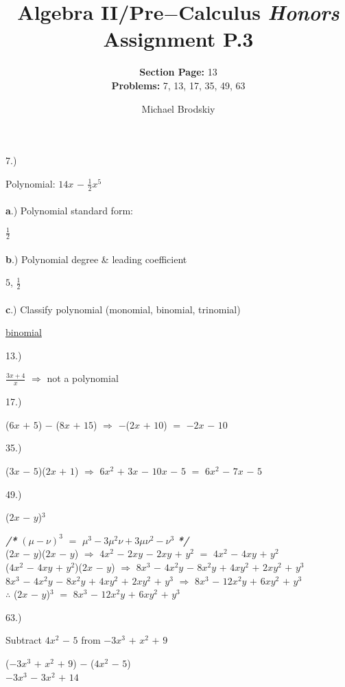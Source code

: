 \documentclass[12pt]{article}
\title{\textbf{Algebra II/Pre$-$Calculus \textit{Honors}}  \\ Assignment P.3}
\date{}
\subtitle{\textbf{Section Page:} 13\\\textbf{Problems:} 7, 13, 17, 35, 49, 63}
\author{Michael Brodskiy}
\begin{document}
\maketitle
{\setlength{\parindent}{0cm}
7.) 
    \begin{center} Polynomial: $14x$ $-$ $\frac{1}{2}x^5$ \end{center}
    \paragraph{}\textbf{a}.) Polynomial standard form:
        \begin{center} $\frac{1}{2}$ \end{center}
    \paragraph{}\textbf{b}.) Polynomial degree \& leading coefficient
        \begin{center} $5$, $\frac{1}{2}$ \end{center}
    \paragraph{}\textbf{c}.) Classify polynomial (monomial, binomial, trinomial)
        \begin{center} \underline{binomial} \end{center}
}
{\setlength{\parindent}{0cm}
13.) 
    \begin{center} $\frac{3x + 4}{x}$ $\Longrightarrow$ not a polynomial \end{center}
}
{\setlength{\parindent}{0cm}
17.) 
    \begin{center} ($6x$ $+$ $5$) $-$ ($8x$ $+$ $15$) $\Longrightarrow$ $-$($2x$ $+$ $10$) $=$ $-2x$ $-$ $10$ \end{center}
}
{\setlength{\parindent}{0cm}
35.)
    \begin{center} ($3x$ $-$ $5$)($2x$ $+$ $1$) $\Longrightarrow$ $6x^2$ $+$ $3x$ $-$ $10x$ $-$ $5$ $=$ $6x^2$ $-$ $7x$ $-$ $5$ \end{center}
}
{\setlength{\parindent}{0cm}
49.) 
    \begin{center} ($2x$ $-$ $y$)$^{3}$ \end{center}
    \begin{center}
        \textbf{\textit{/*}} $(\mu-\nu)^3$ $=$ $\mu^3-3\mu^2\nu+3\mu \nu^2-\nu^3$ \textbf{\textit{*/}} \\
        ($2x$ $-$ $y$)($2x$ $-$ $y$) $\Longrightarrow$ $4x^2$ $-$ $2xy$ $-$ $2xy$ $+$ $y^2$ $=$ $4x^2$ $-$ $4xy$ $+$ $y^2$ \\
        ($4x^2$ $-$ $4xy$ $+$ $y^2$)($2x$ $-$ $y$) $\Longrightarrow$ $8x^3$ $-$ $4x^2y$ $-$ $8x^2y$ $+$ $4xy^2$ $+$ $2xy^2$ $+$ $y^3$ \\
        $8x^3$ $-$ $4x^2y$ $-$ $8x^2y$ $+$ $4xy^2$ $+$ $2xy^2$ $+$ $y^3$ $\Longrightarrow$ $8x^3$ $-$ $12x^2y$ $+$ $6xy^2$ $+$ $y^3$ \\
        $\therefore$ ($2x$ $-$ $y$)$^{3}$ $=$ $8x^3$ $-$ $12x^2y$ $+$ $6xy^2$ $+$ $y^3$ 
    \end{center}
}
{\setlength{\parindent}{0cm}
63.) 
    \begin{center} Subtract $4x^2$ $-$ $5$ from $-3x^3$ $+$ $x^2$ $+$ $9$ \end{center} 
    \begin{center}
        ($-3x^3$ $+$ $x^2$ $+$ $9$) $-$ ($4x^2$ $-$ $5$) \\
        $-3x^3$ $-$ $3x^2$ $+$ $14$
    \end{center}
}
\end{document}
